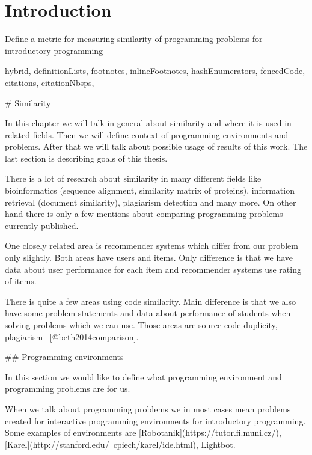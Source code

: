 \documentclass[
  digital, %
  table,   %
  lof,     %
  lot,     %
]{fithesis3}
\begin{document}
\chapter*{Introduction}

Define a metric for measuring similarity of programming problems
for introductory programming

\begin{markdown*}{%
  hybrid,
  definitionLists,
  footnotes,
  inlineFootnotes,
  hashEnumerators,
  fencedCode,
  citations,
  citationNbsps,
}

%
%


%
%

# Similarity

In this chapter we will talk in general about similarity and where it is used in related fields. Then we will define context of programming environments and problems. After that we will talk about possible usage of results of this work. The last section is describing goals of this thesis.

There is a lot of research about similarity in many different fields like bioinformatics (sequence alignment, similarity matrix of proteins), information retrieval (document similarity), plagiarism detection and many more. On other hand there is only a few mentions about comparing programming problems currently published.

One closely related area is recommender systems which differ from our problem only slightly. Both areas have users and items. Only difference is that we have data about user performance for each item and recommender systems use rating of items.

There is quite a few areas using code similarity. Main difference is that we also have some problem statements and data about performance of students when solving problems which we can use. Those areas are source code duplicity, plagiarism ~[@beth2014comparison].

## Programming environments

In this section we would like to define what programming environment and programming problems are for us.

When we talk about programming problems we in most cases mean problems created for interactive programming environments for introductory programming. Some examples of environments are [Robotanik](https://tutor.fi.muni.cz/), [Karel](http://stanford.edu/~cpiech/karel/ide.html), Lightbot.


\end{markdown*}
\end{document}
